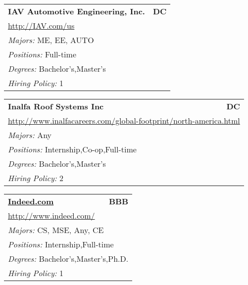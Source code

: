 \documentclass[twoside]{article}
\begin{document}
\begin{center}
\begin{multicols}{3}
\begin{FlushLeft}
\begin{minipage}{.9\columnwidth}
\end{minipage}
 
\begin{minipage}{.9\columnwidth}\begin{tabularx}{.95\columnwidth}{Xr}
                 {\Large\bf IAV Automotive Engineering, Inc.} & {\Large\bf DC}\\
    \multicolumn{2}{p{.95\columnwidth}}{\url{http://IAV.com/us}}\\
    \multicolumn{2}{p{.95\columnwidth}}{\emph{Majors:} ME, EE, AUTO}\\
    \multicolumn{2}{p{.95\columnwidth}}{\emph{Positions:} Full-time}\\
    \multicolumn{2}{p{.95\columnwidth}}{\emph{Degrees:} Bachelor's,Master's}\\
    \multicolumn{2}{p{.95\columnwidth}}{\emph{Hiring Policy:} 1}\\
    \end{tabularx}
    
\end{minipage}
 
\begin{minipage}{.9\columnwidth}\begin{tabularx}{.95\columnwidth}{Xr}
                 {\Large\bf Inalfa Roof Systems Inc} & {\Large\bf DC}\\
    \multicolumn{2}{p{.95\columnwidth}}{\url{http://www.inalfacareers.com/global-footprint/north-america.html}}\\
    \multicolumn{2}{p{.95\columnwidth}}{\emph{Majors:} Any}\\
    \multicolumn{2}{p{.95\columnwidth}}{\emph{Positions:} Internship,Co-op,Full-time}\\
    \multicolumn{2}{p{.95\columnwidth}}{\emph{Degrees:} Bachelor's,Master's}\\
    \multicolumn{2}{p{.95\columnwidth}}{\emph{Hiring Policy:} 2}\\
    \end{tabularx}
    
\end{minipage}
 
\begin{minipage}{.9\columnwidth}\begin{tabularx}{.95\columnwidth}{Xr}
                 {\Large\bf \url{Indeed.com}} & {\Large\bf BBB}\\
    \multicolumn{2}{p{.95\columnwidth}}{\url{http://www.indeed.com/}}\\
    \multicolumn{2}{p{.95\columnwidth}}{\emph{Majors:} CS, MSE, Any, CE}\\
    \multicolumn{2}{p{.95\columnwidth}}{\emph{Positions:} Internship,Full-time}\\
    \multicolumn{2}{p{.95\columnwidth}}{\emph{Degrees:} Bachelor's,Master's,Ph.D.}\\
    \multicolumn{2}{p{.95\columnwidth}}{\emph{Hiring Policy:} 1}\\
    \end{tabularx}
    

\end{minipage}
\end{FlushLeft}
\end{multicols}
\end{center}
\end{document}
